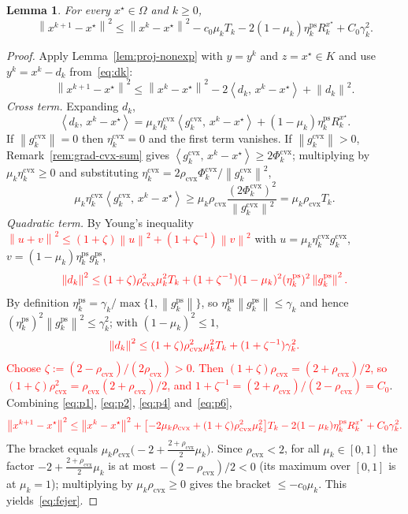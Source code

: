 \documentclass[]{interact}
\theoremstyle{plain}
\newtheorem{lemma}[theorem]{Lemma}
\theoremstyle{definition}
\theoremstyle{remark}
\newcommand{\norm}[1]{\left\lVert #1 \right\rVert}
\newcommand{\inner}[2]{\left\langle #1,\, #2 \right\rangle}
\newcommand{\cvx}{\mathrm{cvx}}
\newcommand{\ps}{\mathrm{ps}}
\begin{document}
\begin{lemma}\label{lem:fejer}
For every $x^\star\in\Omega$ and $k\ge 0$,
\begin{equation}\label{eq:fejer}
\norm{x^{k+1}-x^\star}^2\le\norm{x^k-x^\star}^2-c_0\mu_k T_k-2(1-\mu_k)\eta^{\ps}_k R^{x^\star}_k+C_0\gamma_k^2 .
\end{equation}
\end{lemma}
\begin{proof}
Apply Lemma~\ref{lem:proj-nonexp} with $y=y^k$ and $z=x^\star\in K$ and use $y^k=x^k-d_k$ from~\eqref{eq:dk}:
\begin{equation}\label{eq:p1}
\norm{x^{k+1}-x^\star}^2\le\norm{x^k-x^\star}^2-2\inner{d_k}{x^k-x^\star}+\norm{d_k}^2 .
\end{equation}
\emph{Cross term.} Expanding $d_k$,
\begin{equation}\label{eq:p2}
\inner{d_k}{x^k-x^\star}=\mu_k\eta^{\cvx}_k\inner{g^{\cvx}_k}{x^k-x^\star}+(1-\mu_k)\eta^{\ps}_k R^{x^\star}_k .
\end{equation}
If $\norm{g^{\cvx}_k}=0$ then $\eta^{\cvx}_k=0$ and the first term vanishes. If $\norm{g^{\cvx}_k}>0$, Remark~\ref{rem:grad-cvx-sum} gives $\inner{g^{\cvx}_k}{x^k-x^\star}\ge 2\Phi^{\cvx}_k$; multiplying by $\mu_k\eta^{\cvx}_k\ge 0$ and substituting $\eta^{\cvx}_k=2\rho_{\cvx}\Phi^{\cvx}_k/\norm{g^{\cvx}_k}^2$,
\begin{equation}\label{eq:p4}
\mu_k\eta^{\cvx}_k\inner{g^{\cvx}_k}{x^k-x^\star}\ge\mu_k\rho_{\cvx}\frac{(2\Phi^{\cvx}_k)^2}{\norm{g^{\cvx}_k}^2}=\mu_k\rho_{\cvx}T_k .
\end{equation}
\emph{Quadratic term.} By Young's inequality \leavevmode\textcolor{red}{$\norm{u+v}^2\le(1+\zeta)\norm{u}^2+(1+\zeta^{-1})\norm{v}^2$} with $u=\mu_k\eta^{\cvx}_k g^{\cvx}_k$, $v=(1-\mu_k)\eta^{\ps}_k g^{\ps}_k$,
\[\textcolor{red}{
\norm{d_k}^2\le(1+\zeta)\rho_{\cvx}^2\mu_k^2 T_k+(1+\zeta^{-1})(1-\mu_k)^2(\eta^{\ps}_k)^2\norm{g^{\ps}_k}^2 .
}\]
By definition $\eta^{\ps}_k=\gamma_k/\max\{1,\norm{g^{\ps}_k}\}$, so $\eta^{\ps}_k\norm{g^{\ps}_k}\le\gamma_k$ and hence $(\eta^{\ps}_k)^2\norm{g^{\ps}_k}^2\le\gamma_k^2$; with $(1-\mu_k)^2\le 1$,
\begin{equation}\label{eq:p6}\textcolor{red}{
\norm{d_k}^2\le(1+\zeta)\rho_{\cvx}^2\mu_k^2 T_k+(1+\zeta^{-1})\gamma_k^2 .
}\end{equation}
\leavevmode\textcolor{red}{Choose $\zeta:=(2-\rho_{\cvx})/(2\rho_{\cvx})>0$. Then $(1+\zeta)\rho_{\cvx}=(2+\rho_{\cvx})/2$, so $(1+\zeta)\rho_{\cvx}^2=\rho_{\cvx}(2+\rho_{\cvx})/2$, and $1+\zeta^{-1}=(2+\rho_{\cvx})/(2-\rho_{\cvx})=C_0$}. Combining \eqref{eq:p1}, \eqref{eq:p2}, \eqref{eq:p4} and~\eqref{eq:p6},
\[\textcolor{red}{
\norm{x^{k+1}-x^\star}^2\le\norm{x^k-x^\star}^2+\bigl[-2\mu_k\rho_{\cvx}+(1+\zeta)\rho_{\cvx}^2\mu_k^2\bigr]T_k-2(1-\mu_k)\eta^{\ps}_k R^{x^\star}_k+C_0\gamma_k^2 .
}\]
The bracket equals $\mu_k\rho_{\cvx}\bigl(-2+\tfrac{2+\rho_{\cvx}}{2}\mu_k\bigr)$. Since $\rho_{\cvx}<2$, for all $\mu_k\in[0,1]$ the factor $-2+\tfrac{2+\rho_{\cvx}}{2}\mu_k$ is at most $-(2-\rho_{\cvx})/2<0$ (its maximum over $[0,1]$ is at $\mu_k=1$); multiplying by $\mu_k\rho_{\cvx}\ge0$ gives the bracket $\le -c_0\mu_k$. This yields~\eqref{eq:fejer}.
\end{proof}
\end{document}

